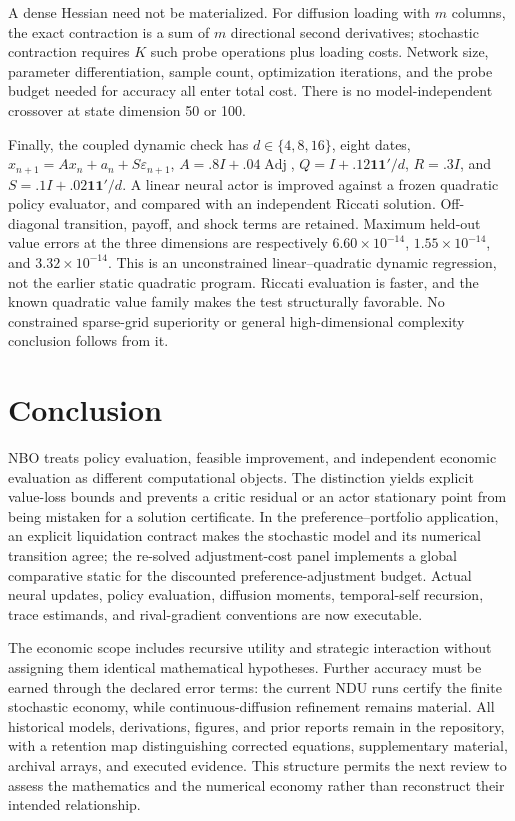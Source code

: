 A dense Hessian need not be materialized. For diffusion loading with $m$ columns, the exact contraction is a sum of $m$ directional second derivatives; stochastic contraction requires $K$ such probe operations plus loading costs. Network size, parameter differentiation, sample count, optimization iterations, and the probe budget needed for accuracy all enter total cost. There is no model-independent crossover at state dimension 50 or 100.

Finally, the coupled dynamic check has $d\in\{4,8,16\}$, eight dates,
$x_{n+1}=Ax_n+a_n+S\varepsilon_{n+1}$,
$A=.8I+.04\operatorname{Adj}$, $Q=I+.12\mathbf1\mathbf1'/d$, $R=.3I$, and $S=.1I+.02\mathbf1\mathbf1'/d$.
A linear neural actor is improved against a frozen quadratic policy evaluator, and compared with an independent Riccati solution. Off-diagonal transition, payoff, and shock terms are retained. Maximum held-out value errors at the three dimensions are respectively $6.60\times10^{-14}$, $1.55\times10^{-14}$, and $3.32\times10^{-14}$. This is an unconstrained linear--quadratic dynamic regression, not the earlier static quadratic program. Riccati evaluation is faster, and the known quadratic value family makes the test structurally favorable. No constrained sparse-grid superiority or general high-dimensional complexity conclusion follows from it.

\section{Conclusion}
NBO treats policy evaluation, feasible improvement, and independent economic evaluation as different computational objects. The distinction yields explicit value-loss bounds and prevents a critic residual or an actor stationary point from being mistaken for a solution certificate. In the preference--portfolio application, an explicit liquidation contract makes the stochastic model and its numerical transition agree; the re-solved adjustment-cost panel implements a global comparative static for the discounted preference-adjustment budget. Actual neural updates, policy evaluation, diffusion moments, temporal-self recursion, trace estimands, and rival-gradient conventions are now executable.

The economic scope includes recursive utility and strategic interaction without assigning them identical mathematical hypotheses. Further accuracy must be earned through the declared error terms: the current NDU runs certify the finite stochastic economy, while continuous-diffusion refinement remains material. All historical models, derivations, figures, and prior reports remain in the repository, with a retention map distinguishing corrected equations, supplementary material, archival arrays, and executed evidence. This structure permits the next review to assess the mathematics and the numerical economy rather than reconstruct their intended relationship.
